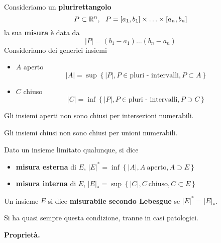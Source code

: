 Consideriamo un \textbf{plurirettangolo}
\begin{equation*}
P\subset \mathbb{R}^{n}, \ \ P =[a_{1}, b_{1}] \times \dotsc \times [a_{n}, b_{n}]
\end{equation*}
la sua \textbf{misura} è data da
\begin{equation*}
| P| = (b_{1} - a_{1}) \dotsc (b_{n} - a_{n})
\end{equation*}
Consideriamo dei generici insiemi
\begin{itemize}
\item $A$ aperto
\begin{equation*}
| A| = \sup \left\{| P|, P\in \text{pluri - intervalli}, P\subset A\right\}
\end{equation*}
\item $C$ chiuso
\begin{equation*}
| C| = \inf\left\{| P|, P\in \text{pluri - intervalli}, P\supset C\right\}
\end{equation*}
\end{itemize}
\begin{rem}
Gli insiemi aperti non sono chiusi per intersezioni numerabili.
\end{rem}
\begin{rem}
Gli insiemi chiusi non sono chiusi per unioni numerabili.
\end{rem}
Dato un insieme limitato qualunque, si dice
\begin{itemize}
\item \textbf{misura esterna} di $E$, $| E|^{*} = \inf\left\{| A|, A\ \text{aperto}, A\supset E\right\}$
\item \textbf{misura interna} di $E$, $| E|_{*} = \sup \left\{| C|, C\ \text{chiuso}, C\subset E\right\}$
\end{itemize}
\begin{defn}
Un insieme $E$ si dice \textbf{misurabile secondo Lebesgue} se $| E|^{*} =| E|_{*}$.
\end{defn}
Si ha quasi sempre questa condizione, tranne in casi patologici.

\textbf{Proprietà.}

